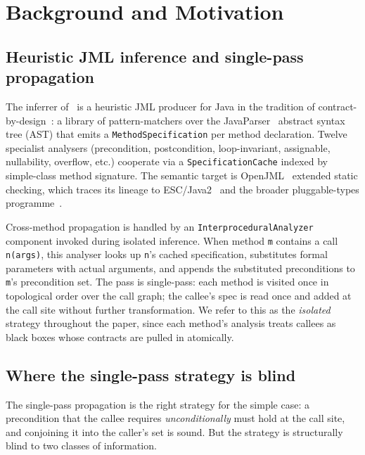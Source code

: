 \section{Background and Motivation}
\label{sec:background}

\subsection{Heuristic JML inference and single-pass propagation}

The inferrer of~\cite{edmonds2026inference} is a heuristic JML producer for Java in the tradition of contract-by-design~\cite{meyer1992design,jml,leavens2006design,chalin2010jml}: a library of pattern-matchers over the JavaParser~\cite{javaparser} abstract syntax tree (AST) that emits a \texttt{MethodSpecification} per method declaration. Twelve specialist analysers (precondition, postcondition, loop-invariant, assignable, nullability, overflow, etc.) cooperate via a \texttt{SpecificationCache} indexed by simple-class method signature. The semantic target is OpenJML~\cite{openjml} extended static checking, which traces its lineage to ESC/Java2~\cite{flanagan2002extended} and the broader pluggable-types programme~\cite{papi2008practical}.

Cross-method propagation is handled by an
\texttt{InterproceduralAnalyzer} component invoked during isolated
inference. When method \texttt{m} contains a call \texttt{n(args)},
this analyser looks up \texttt{n}'s cached specification, substitutes
formal parameters with actual arguments, and appends the substituted
preconditions to \texttt{m}'s precondition set. The pass is
single-pass: each method is visited once in topological order over the
call graph; the callee's spec is read once and added at the call site
without further transformation. We refer to this as the \emph{isolated}
strategy throughout the paper, since each method's analysis treats
callees as black boxes whose contracts are pulled in atomically.

\subsection{Where the single-pass strategy is blind}

The single-pass propagation is the right strategy for the simple case:
a precondition that the callee requires \emph{unconditionally} must
hold at the call site, and conjoining it into the caller's set is
sound. But the strategy is structurally blind to two classes of
information.

